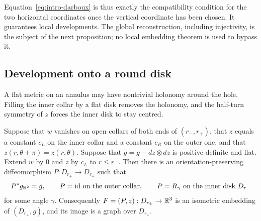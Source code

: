 Equation~\eqref{eq:intro-darboux} is thus exactly the compatibility
condition for the two horizontal coordinates once the vertical
coordinate has been chosen. It guarantees local developments. The
global reconstruction, including injectivity, is the subject of the
next proposition; no local embedding theorem is used to bypass it.

\subsection{Development onto a round disk}

A flat metric on an annulus may have nontrivial holonomy around the
hole. Filling the inner collar by a flat disk removes the holonomy,
and the half-turn symmetry of $z$ forces the inner disk to stay
centred.

\begin{proposition}\label{lem:disk-development}
Suppose that $w$ vanishes on open collars of both ends of
$(r_-,r_+)$, that $z$ equals a constant $c_L$ on the inner collar and
a constant $c_R$ on the outer one, and that
$z(r,\theta+\pi)=z(r,\theta)$. Suppose that $\bar g=g-dz\otimes dz$ is
positive definite and flat. Extend $w$ by $0$ and $z$ by $c_L$ to
$r\le r_-$. Then there is an orientation-preserving diffeomorphism
$P:D_{r_+}\to D_{r_+}$ such that
\[
 P^*g_{\mathbb R^2}=\bar g,
 \qquad P=\mathrm{id}\ \text{on the outer collar},
 \qquad P=R_\gamma\ \text{on the inner disk }D_{r_-}
\]
for some angle $\gamma$. Consequently $F=(P,z):D_{r_+}\to\mathbb R^3$ is an
isometric embedding of $(D_{r_+},g)$, and its image is a graph over
$D_{r_+}$.
\end{proposition}

